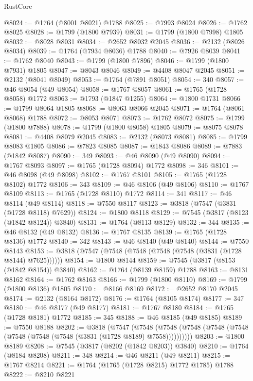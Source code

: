 \begin{lexlean}{RustCore}
\begin{coremodule}
@8024 := @1764 (@8001 @8021) @1788
@8025 := @7993 @8024
@8026 := @1762 @8025
@8028 := @1799 (@1800 @7939)
@8031 := @1799 (@1800 @7998) @1805
@8032 := @8028 @8031
@8034 := @2652 @8032 @2045
@8036 := @2132 (@8026 @8034)
@8039 := @1764 (@7934 @8036) @1788
@8040 := @7926 @8039
@8041 := @1762 @8040
@8043 := @1799 (@1800 @7896)
@8046 := @1799 (@1800 @7931) @1805
@8047 := @8043 @8046
@8049 := @4408 @8047 @2045
@8051 := @2132 (@8041 @8049)
@8053 := @1764 (@7891 @8051)
@8054 := 340
@8057 := @46 @8054 (@49 @8054)
@8058 := @1767 @8057
@8061 := @1765 (@1728 @8058) @1772
@8063 := @1793 (@1847 @1255)
@8064 := @1800 @1731
@8066 := @1799 @8064 @1805
@8068 := @8063 @8066 @2045
@8071 := @1764 (@8061 @8068) @1788
@8072 := @8053 @8071
@8073 := @1762 @8072
@8075 := @1799 (@1800 @7888)
@8078 := @1799 (@1800 @8058) @1805
@8079 := @8075 @8078
@8081 := @4408 @8079 @2045
@8083 := @2132 (@8073 @8081)
@8085 := @1799 @8083 @1805
@8086 := @7823 @8085
@8087 := @1843 @8086
@8089 := @7883 (@1842 @8087)
@8090 := 349
@8093 := @46 @8090 (@49 @8090)
@8094 := @1767 @8093
@8097 := @1765 (@1728 @8094) @1772
@8098 := 346
@8101 := @46 @8098 (@49 @8098)
@8102 := @1767 @8101
@8105 := @1765 (@1728 @8102) @1772
@8106 := 343
@8109 := @46 @8106 (@49 @8106)
@8110 := @1767 @8109
@8113 := @1765 (@1728 @8110) @1772
@8114 := 341
@8117 := @46 @8114 (@49 @8114)
@8118 := @7550 @8117
@8123 := @3818 (@7547 (@3831 (@1728 @8118) @7629))
@8124 := @1800 @8118
@8129 := @7545 (@3817 (@8123 (@1842 @8124)) @3840)
@8131 := @1764 (@8113 @8129)
@8132 := 344
@8135 := @46 @8132 (@49 @8132)
@8136 := @1767 @8135
@8139 := @1765 (@1728 @8136) @1772
@8140 := 342
@8143 := @46 @8140 (@49 @8140)
@8144 := @7550 @8143
@8153 := @3818 (@7547 (@7548 (@7548 (@7548 (@7548 (@3831 (@1728 @8144) @7625))))))
@8154 := @1800 @8144
@8159 := @7545 (@3817 (@8153 (@1842 @8154)) @3840)
@8162 := @1764 (@8139 @8159) @1788
@8163 := @8131 @8162
@8164 := @1762 @8163
@8166 := @1799 (@1800 @8110)
@8169 := @1799 (@1800 @8136) @1805
@8170 := @8166 @8169
@8172 := @2652 @8170 @2045
@8174 := @2132 (@8164 @8172)
@8176 := @1764 (@8105 @8174)
@8177 := 347
@8180 := @46 @8177 (@49 @8177)
@8181 := @1767 @8180
@8184 := @1765 (@1728 @8181) @1772
@8185 := 345
@8188 := @46 @8185 (@49 @8185)
@8189 := @7550 @8188
@8202 := @3818
    (@7547
      (@7548 (@7548 (@7548 (@7548 (@7548 (@7548 (@7548 (@7548 (@3831 (@1728 @8189) @7558))))))))))
@8203 := @1800 @8189
@8208 := @7545 (@3817 (@8202 (@1842 @8203)) @3840)
@8210 := @1764 (@8184 @8208)
@8211 := 348
@8214 := @46 @8211 (@49 @8211)
@8215 := @1767 @8214
@8221 := @1764 (@1765 (@1728 @8215) @1772 @1785) @1788
@8222 := @8210 @8221

\end{coremodule}
\end{lexlean}
